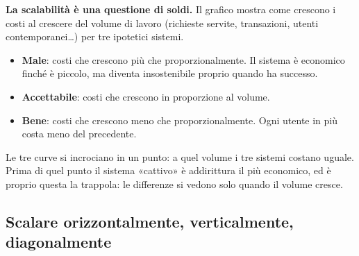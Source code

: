 \noindent\begin{minipage}[c]{0.5\textwidth}
\textbf{La scalabilità è una questione di soldi.} Il grafico mostra come crescono i costi al crescere del volume di lavoro
(richieste servite, transazioni, utenti contemporanei\ldots) per tre ipotetici sistemi.
\begin{itemize}
  \item \textcolor{swred}{\textbf{Male}}: costi che crescono più che proporzionalmente. Il sistema è economico finché è
        piccolo, ma diventa insostenibile proprio quando ha successo.
  \item \textcolor{swteal}{\textbf{Accettabile}}: costi che crescono in proporzione al volume.
  \item \textcolor{swgreen}{\textbf{Bene}}: costi che crescono meno che proporzionalmente. Ogni utente in più costa meno
        del precedente.
\end{itemize}
Le tre curve si incrociano in un punto: a quel volume i tre sistemi costano uguale. Prima di quel punto il sistema
«cattivo» è addirittura il più economico, ed è proprio questa la trappola: le differenze si vedono solo quando il volume
cresce.
\end{minipage}\hfill
\begin{minipage}[c]{0.46\textwidth}
\centering
{}
\end{minipage}

\subsection{Scalare orizzontalmente, verticalmente, diagonalmente}

